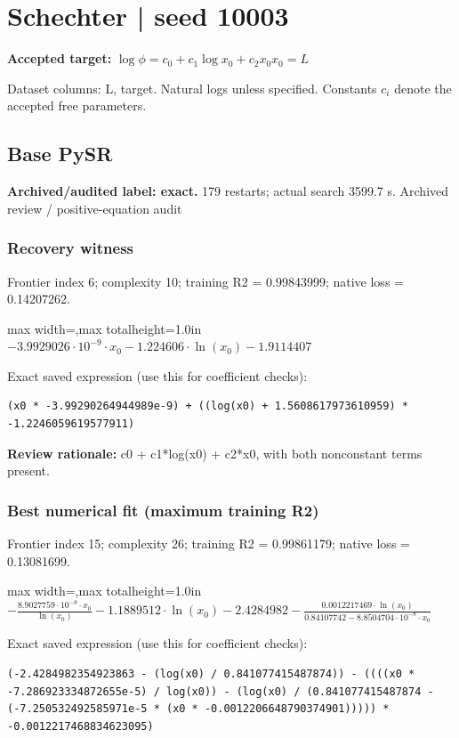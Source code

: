 \documentclass[10pt,letterpaper,landscape]{article}
\begin{document}
\section*{Schechter | seed 10003}
\textbf{Accepted target:} $\displaystyle \log\phi=c_0+c_1\log x_0+c_2x_0$\hfill $x_0=L$\par
{\small Dataset columns: L, target. Natural logs unless specified. Constants $c_i$ denote the accepted free parameters.}\par\medskip
\begin{minipage}[t]{0.485\textwidth}
\subsection*{Base PySR}
\textbf{Archived/audited label: exact.} 179 restarts; actual search 3599.7 s.
{\small Archived review / positive-equation audit}
\subsubsection*{Recovery witness}
Frontier index 6; complexity 10; training R2 = 0.99843999; native loss = 0.14207262.
\begin{center}\begin{adjustbox}{max width=\linewidth,max totalheight=1.0in}$\displaystyle - 3.9929026 \cdot 10^{-9} \cdot x_{0} - 1.224606 \cdot \ln{\left(x_{0} \right)} - 1.9114407$\end{adjustbox}\end{center}
{\scriptsize Exact saved expression (use this for coefficient checks):}
\begin{lstlisting}
(x0 * -3.99290264944989e-9) + ((log(x0) + 1.5608617973610959) * -1.2246059619577911)
\end{lstlisting}
{\small\textbf{Review rationale:} c0 + c1*log(x0) + c2*x0, with both nonconstant terms present.}
\subsubsection*{Best numerical fit (maximum training R2)}
Frontier index 15; complexity 26; training R2 = 0.99861179; native loss = 0.13081699.
\begin{center}\begin{adjustbox}{max width=\linewidth,max totalheight=1.0in}$\displaystyle - \frac{8.9027759 \cdot 10^{-8} \cdot x_{0}}{\ln{\left(x_{0} \right)}} - 1.1889512 \cdot \ln{\left(x_{0} \right)} - 2.4284982 - \frac{0.0012217469 \cdot \ln{\left(x_{0} \right)}}{0.84107742 - 8.8504704 \cdot 10^{-8} \cdot x_{0}}$\end{adjustbox}\end{center}
{\scriptsize Exact saved expression (use this for coefficient checks):}
\begin{lstlisting}
(-2.4284982354923863 - (log(x0) / 0.841077415487874)) - ((((x0 * -7.286923334872655e-5) / log(x0)) - (log(x0) / (0.841077415487874 - (-7.250532492585971e-5 * (x0 * -0.0012206648790374901))))) * -0.0012217468834623095)
\end{lstlisting}
\end{minipage}\hfill
\end{document}
